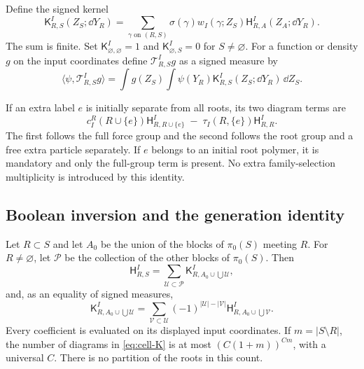Define the signed kernel
\begin{equation}
 \mathsf K^I_{R,S}(Z_S;\dd Y_R)
  =\sum_{\gamma\text{ on }(R,S)}
       \sigma(\gamma)w_I(\gamma;Z_S)
       \mathsf H^I_{R,A}(Z_A;\dd Y_R).
 \label{eq:cell-K}
\end{equation}
The sum is finite.  Set $\mathsf K^I_{\varnothing,\varnothing}=1$ and
$\mathsf K^I_{\varnothing,S}=0$ for $S\ne\varnothing$.
For a function or density $g$ on the input coordinates define
$\mathcal T^I_{R,S}g$ as a signed measure by
\begin{equation}
 \langle\psi,\mathcal T^I_{R,S}g\rangle
 =\int g(Z_S)\int\psi(Y_R)
                   \mathsf K^I_{R,S}(Z_S;\dd Y_R)\,\dd Z_S.
 \label{eq:cell-T}
\end{equation}

\begin{remark}
\label{rem:cell-single}
If an extra label $e$ is initially separate from all roots, its two
diagram terms are
\[
 c_I^R(R\cup\{e\})\mathsf H^I_{R,R\cup\{e\}}
 \; -\;
 \tau_I(R,\{e\})\mathsf H^I_{R,R}.
\]
The first follows the full force group and the second follows the
root group and a free extra particle separately.  If $e$ belongs to
an initial root polymer, it is mandatory and only the full-group term
is present.  No extra family-selection multiplicity is introduced
by this identity.
\end{remark}

\subsection{Boolean inversion and the generation identity}

\begin{proposition}
\label{cell:expansion}
Let $R\subset S$ and let $A_0$ be the union of the blocks of
$\pi_0(S)$ meeting $R$.  For $R\ne\varnothing$, let $\mathcal P$ be
the collection of the other blocks of $\pi_0(S)$.  Then
\begin{equation}
 \mathsf H^I_{R,S}
 =\sum_{\mathcal U\subset\mathcal P}
      \mathsf K^I_{R,A_0\cup\bigcup\mathcal U},
 \label{eq:cell-subset-sum}
\end{equation}
and, as an equality of signed measures,
\begin{equation}
 \mathsf K^I_{R,A_0\cup\bigcup\mathcal U}
  =\sum_{\mathcal V\subset\mathcal U}
       (-1)^{|\mathcal U|-|\mathcal V|}
       \mathsf H^I_{R,A_0\cup\bigcup\mathcal V}.
 \label{eq:cell-boolean}
\end{equation}
Every coefficient is evaluated on its displayed input coordinates.
If $m=|S\setminus R|$, the number of diagrams in
\eqref{eq:cell-K} is at most $(C(1+m))^{Cm}$, with a universal $C$.
There is no partition of the roots in this count.
\end{proposition}

